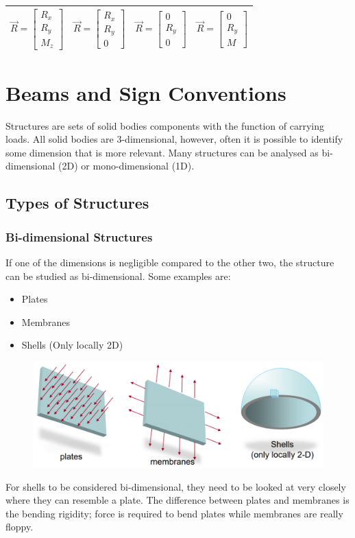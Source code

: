 \documentclass[class=report, crop=false, 12pt,a4paper]{standalone}
\begin{document}
\begin{center}
\begin{tabular}{ |c|c|c|c| }
   \hline
   $\vec{R} = \left[ \begin{array}{ccc} R_x \\ R_y \\ M_z \end{array}\right]$ & $\vec{R} = \left[ \begin{array}{ccc} R_x \\ R_y \\ 0 \end{array}\right]$ & $\vec{R} = \left[ \begin{array}{ccc} 0 \\ R_y \\ 0 \end{array}\right]$ & $\vec{R} = \left[ \begin{array}{ccc} 0 \\ R_y \\ M \end{array}\right]$ \\
   \hline
  \end{tabular}
\end{center}
\section{Beams and Sign Conventions}
Structures are sets of solid bodies components with the function of carrying loads. All solid bodies are 3-dimensional, however, often it is possible to identify some dimension that is more relevant. Many structures can be analysed as bi-dimensional (2D) or mono-dimensional (1D).
\subsection{Types of Structures}
\subsubsection{Bi-dimensional Structures}
If one of the dimensions is negligible compared to the other two, the
structure can be studied as bi-dimensional. Some examples are:
\begin{itemize}[noitemsep]
  \item Plates
  \item Membranes
  \item Shells (Only locally 2D)
\end{itemize}
\begin{figure}[H]
  \centering
  \includegraphics[width = 0.8 \textwidth]{../img/bidimensionalstructures.PNG}
\end{figure}
For shells to be considered bi-dimensional, they need to be looked at very closely where they can resemble a plate. The difference between plates and membranes is the bending rigidity; force is required to bend plates while membranes are really floppy. 
\end{document}
